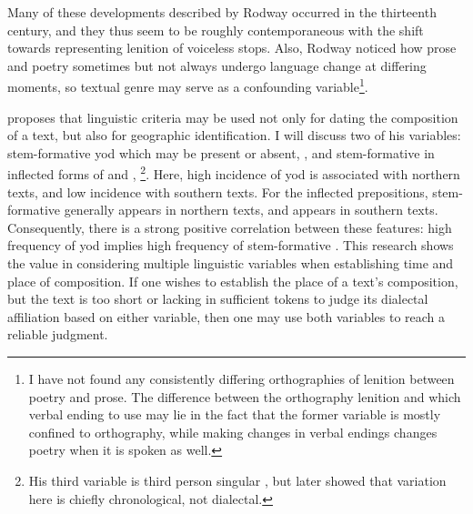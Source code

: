 Many of these developments described by Rodway occurred in the thirteenth century, and they thus seem to be roughly contemporaneous with the shift towards representing lenition of voiceless stops. Also, Rodway noticed how prose and poetry sometimes but not always undergo language change at differing moments, so textual genre may serve as a confounding variable\footnote{I have not found any consistently differing orthographies of lenition between poetry and prose. The difference between the orthography lenition and which verbal ending to use may lie in the fact that the former variable is mostly confined to orthography, while making changes in verbal endings changes poetry when it is spoken as well.}.


\Textcite{Tho_Middle93} proposes that linguistic criteria may be used not only for dating the composition of a text, but also for geographic identification. I will discuss two of his variables:  stem-formative yod which may be present or absent, \eg {}, and stem-formative  in inflected forms of  and , \eg {}\footnote{His third variable is third person singular , but \textcite{Rod_Datable98} later showed that variation here is chiefly chronological, not dialectal.}. Here, high incidence of yod is associated with northern texts, and low incidence with southern texts. For the inflected prepositions, stem-formative  generally appears in northern texts, and  appears in southern texts. Consequently, there is a strong positive correlation between these features: high frequency of yod implies high frequency of stem-formative . This research shows the value in considering multiple linguistic variables when establishing time and place of composition. If one wishes to establish the place of a text's composition, but the text is too short or lacking in sufficient tokens to judge its dialectal affiliation based on either variable, then one may use both variables to reach a reliable judgment.

